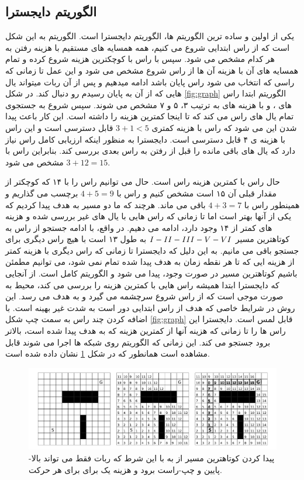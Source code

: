 \subsection{الگوریتم دایجسترا}
یکی از اولین و ساده ترین الگوریتم ها، الگوریتم دایجسترا است. الگوریتم به این شکل است که از راس
 ابتدایی شروع می کنیم، همه همسایه های مستقیم با هزینه رفتن به هر کدام مشخص می شود. سپس
با راس با کوچکترین هزینه شروع کرده و تمام همسایه های آن با هزینه آن ها از راس شروع  مشخص
 می شود و این عمل تا زمانی که راسی که انتخاب می شود راس پایان باشد ادامه میدهیم و پس از آن ربات
 میتواند یال هایی که از آن به پایان رسیدم رو دنبال کند.
در شکل 
\ref{fig:graph}
الگوریتم ابتدا راس های 
،
و
با هزینه های به ترتیب ۳، ۵ و ۷ مشخص می شوند. سپس شروع به جستجوی تمام یال های راس 
می کند که تا اینجا کمترین هزینه را داشته است. این کار باعث پیدا شدن این می شود که راس
با هزینه کمتری 
$3+1<5$
قابل دسترسی است و این راس با هزینه ی ۴ قابل  دسترسی است. دایجسترا به منظور اینکه ارزیابی کامل راس
نیاز دارد که یال های باقی مانده را قبل از رفتن به راس بعدی بررسی کند. بنابراین راس 
با 
$3+12=15$
مشخص می شود.

حال راس با کمترین هزینه راس 
است. حال می توانیم راس 
را با ۱۴ که کوچکتر از مقدار قبلی آن ۱۵ است مشخص کنیم و راس
با 
$4+5=9$
برچسب می گذاریم و همینطور راس 
با 
$4+3=7$
باقی می ماند. هرچند که ما دو مسیر به هدف پیدا کردیم که یکی از آنها بهتر است اما تا زمانی که راس 
هایی با یال های غیر بررسی شده و هزینه های کمتر از ۱۴ وجود دارد، ادامه می دهیم.
در واقع، با ادامه جستجو از راس
به کوتاهترین مسیر 
$\rom{1}-\rom{2}-\rom{3}-\rom{5}-\rom{6}$
  به طول ۱۳ است با هیچ راس دیگری برای جستجو باقی می مانیم.
به این دلیل که دایجسترا تا زمانی که راس دیگری با هزینه کمتر از هزینه ایی که تا هر نقطه زمان به هدف
 پیدا شده تمام نمی شود، می توانیم مطمئن باشیم کوتاهترین مسیر در صورت وجود، پیدا می شود و
 الگوریتم کامل
 است.
از آنجایی که دایجسترا ابتدا همیشه راس هایی با کمترین هزینه را بررسی می کند، محیط به صورت موجی است که از راس شروع سرچشمه می گیرد و به هدف می رسد. این روش در شرایط خاصی که هدف از راس ابتدایی دور است به شدت غیر بهینه است. با اضافه کردن چند راس به سمت چپ شکل
\ref{fig:graph}
قابل لمس است.
دایجسترا این راس ها را تا زمانی که  هزینه آنها از کمترین هزینه که به هدف پیدا شده است، بالاتر برود جستجو می کند. این زمانی که الگوریتم روی شبکه ها اجرا می شوند قابل مشاهده است همانطور که در شکل 
\ref{fig:dijkstra}
نشان داده شده است.

\begin{figure}[H]
  \includegraphics[width = \textwidth]{images/dijkstra.png}
  \caption{
 پیدا کردن کوتاهترین مسیر از  
  به
با این شرط که ربات فقط می تواند بالا-پایین و چپ-راست برود و هزینه یک برای برای هر حرکت.
  }
  \label{fig:dijkstra}
\end{figure}
